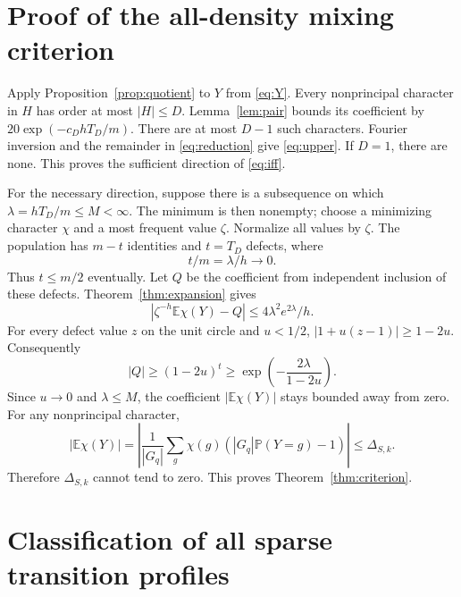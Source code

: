 \documentclass[11pt]{article}
\theoremstyle{remark}\newtheorem{remark}[theorem]{Remark}
\newcommand{\E}{\mathbb E}
\newcommand{\Pp}{\mathbb P}
\begin{document}
\section{Proof of the all-density mixing criterion}\label{sec:criterionproof}

Apply Proposition~\ref{prop:quotient} to $Y$ from \eqref{eq:Y}. Every nonprincipal character in $H$ has order at most $|H|\le D$. Lemma~\ref{lem:pair} bounds its coefficient by
$20\exp(-c_DhT_D/m)$. There are at most $D-1$ such characters. Fourier inversion and the remainder in \eqref{eq:reduction} give \eqref{eq:upper}. If $D=1$, there are none. This proves the sufficient direction of \eqref{eq:iff}.

For the necessary direction, suppose there is a subsequence on which
$\lambda=hT_D/m\le M<\infty$. The minimum is then nonempty; choose a minimizing character $\chi$ and a most frequent value $\zeta$. Normalize all values by $\zeta$. The population has $m-t$ identities and $t=T_D$ defects, where
\[
 t/m=\lambda/h\longrightarrow0.
\]
Thus $t\le m/2$ eventually. Let $Q$ be the coefficient from independent inclusion of these defects. Theorem~\ref{thm:expansion} gives
\[
 \left|\zeta^{-h}\E\chi(Y)-Q\right|
 \le4\lambda^2e^{2\lambda}/h.
\]
For every defect value $z$ on the unit circle and $u<1/2$,
$|1+u(z-1)|\ge1-2u$. Consequently
\[
 |Q|\ge(1-2u)^t
 \ge\exp\left(-\frac{2\lambda}{1-2u}\right).
\]
Since $u\to0$ and $\lambda\le M$, the coefficient $|\E\chi(Y)|$ stays bounded away from zero. For any nonprincipal character,
\[
 |\E\chi(Y)|
 =\left|\frac1{|G_q|}\sum_g\chi(g)
          (|G_q|\Pp(Y=g)-1)\right|\le\Delta_{S,k}.
\]
Therefore $\Delta_{S,k}$ cannot tend to zero. This proves Theorem~\ref{thm:criterion}.

\section{Classification of all sparse transition profiles}\label{sec:classproof}
\end{document}
